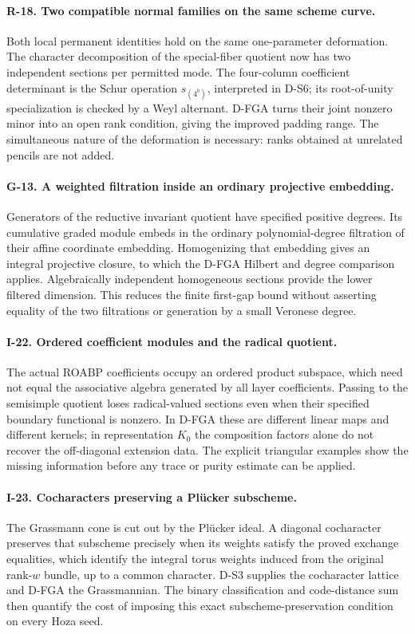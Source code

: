 \documentclass[11pt,a4paper]{article}
\theoremstyle{definition}\newtheorem{definition}{Definition}
\begin{document}
\paragraph{R-18. Two compatible normal families on the same scheme curve.}
Both local permanent identities hold on the same one-parameter deformation. The character decomposition of the special-fiber quotient now has two independent sections per permitted mode. The four-column coefficient determinant is the Schur operation $s_{(4^b)}$, interpreted in D-S6; its root-of-unity specialization is checked by a Weyl alternant. D-FGA turns their joint nonzero minor into an open rank condition, giving the improved padding range. The simultaneous nature of the deformation is necessary: ranks obtained at unrelated pencils are not added.

\paragraph{G-13. A weighted filtration inside an ordinary projective embedding.}
Generators of the reductive invariant quotient have specified positive degrees. Its cumulative graded module embeds in the ordinary polynomial-degree filtration of their affine coordinate embedding. Homogenizing that embedding gives an integral projective closure, to which the D-FGA Hilbert and degree comparison applies. Algebraically independent homogeneous sections provide the lower filtered dimension. This reduces the finite first-gap bound without asserting equality of the two filtrations or generation by a small Veronese degree.

\paragraph{I-22. Ordered coefficient modules and the radical quotient.}
The actual ROABP coefficients occupy an ordered product subspace, which need not equal the associative algebra generated by all layer coefficients. Passing to the semisimple quotient loses radical-valued sections even when their specified boundary functional is nonzero. In D-FGA these are different linear maps and different kernels; in representation $K_0$ the composition factors alone do not recover the off-diagonal extension data. The explicit triangular examples show the missing information before any trace or purity estimate can be applied.

\paragraph{I-23. Cocharacters preserving a Pl\"ucker subscheme.}
The Grassmann cone is cut out by the Pl\"ucker ideal. A diagonal cocharacter preserves that subscheme precisely when its weights satisfy the proved exchange equalities, which identify the integral torus weights induced from the original rank-$w$ bundle, up to a common character. D-S3 supplies the cocharacter lattice and D-FGA the Grassmannian. The binary classification and code-distance sum then quantify the cost of imposing this exact subscheme-preservation condition on every Hoza seed.
\end{document}
